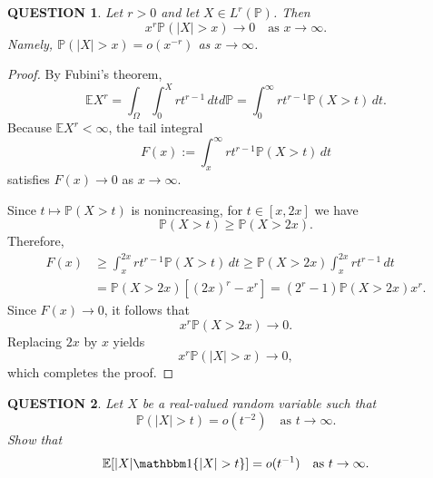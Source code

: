 \documentclass[12pt]{article}
\renewcommand{\(}{\left(}%
\renewcommand{\)}{\right)}%
\renewcommand{\[}{\left[}%
\renewcommand{\]}{\right]}%
\newcommand{\p}{\mathbb{P}}
\newtheorem{question}{QUESTION}[section]}
\newtheorem{proof}{Proof.}}
\begin{document}
\begin{question}
  	Let $r>0$ and let $X\in L^r(\p)$. Then
\begin{equation*}
x^r \mathbb{P}(|X|>x) \longrightarrow 0
\quad \text{as } x \to \infty.
\end{equation*}
Namely, $\p(|X|>x)=o(x^{-r})$ as $x\to\infty$.
  \end{question}

\begin{proof}
By Fubini's theorem,
\begin{equation*}
\mathbb{E}X^r
=\int_\Omega\int_0^X r t^{r-1} \, dtd\p=
\int_0^\infty r t^{r-1} \mathbb{P}(X>t)\, dt.
\end{equation*}
Because $\mathbb{E}X^r < \infty$, the tail integral
\begin{equation*}
F(x)
:=
\int_x^\infty r t^{r-1} \mathbb{P}(X>t)\, dt
\end{equation*}
satisfies $F(x) \longrightarrow 0$ as $x \to \infty.$

Since $t \mapsto \mathbb{P}(X>t)$ is nonincreasing, for $t \in [x,2x]$ we have
\begin{equation*}
\mathbb{P}(X>t)
\ge
\mathbb{P}(X>2x).
\end{equation*}
Therefore,
\begin{equation*}
\begin{split}
	F(x)
&\ge
\int_x^{2x}
r t^{r-1}
\mathbb{P}(X>t)
\, dt
\ge
\mathbb{P}(X>2x)
\int_x^{2x}
r t^{r-1} \, dt\\
&=\mathbb{P}(X>2x)[(2x)^r - x^r]
=(2^r - 1)\mathbb{P}(X>2x)x^r.
\end{split}
\end{equation*}
Since $F(x) \to 0$, it follows that
\begin{equation*}
x^r \mathbb{P}(X>2x) \longrightarrow 0.
\end{equation*}
Replacing $2x$ by $x$ yields
\begin{equation*}
x^r \mathbb{P}(|X|>x) \longrightarrow 0,
\end{equation*}
which completes the proof.
\end{proof}

\begin{question}
Let $X$ be a real-valued random variable such that
\begin{equation*}
\p(|X|>t)=o(t^{-2}) \quad \text{as } t\to\infty.
\end{equation*}
Show that
\begin{equation*}
\mathbb E [ |X|  \mathbbm 1\{|X|>t\} ]
=
o(t^{-1})
\quad \text{as } t\to\infty.
\end{equation*}
\end{question}
\end{document}
